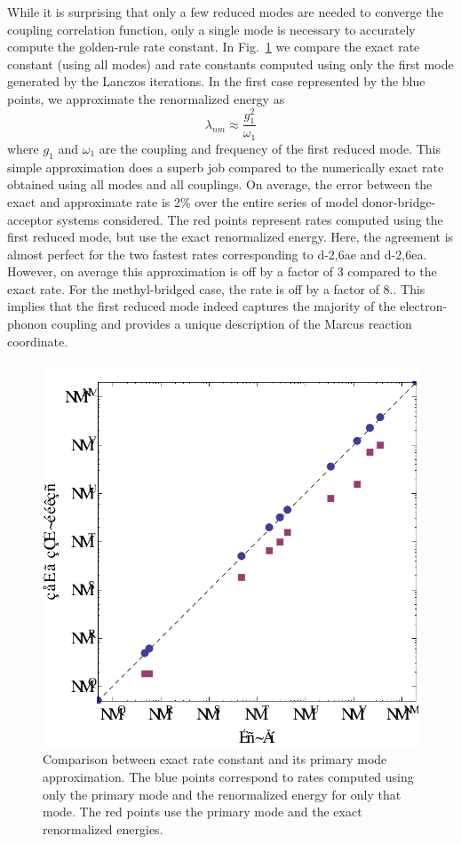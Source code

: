 While it is surprising that only a few reduced modes are needed to converge the coupling correlation function, only
a single mode is necessary to accurately compute the golden-rule rate constant.
In Fig.~\ref{fig-1mode} we compare the exact rate constant (using all modes) and rate constants computed using
only the first mode generated by the Lanczos iterations.   In the first case represented by the blue points,
we approximate the renormalized energy as
$$
\lambda_{nm} \approx \frac{g_{1}^{2}}{\omega_1}
$$
where $g_{1}$ and $\omega_{1}$ are the coupling and frequency of the first  reduced mode.  This simple approximation
does a superb job compared to the numerically exact rate obtained using all modes and all couplings.
On average, the error between the exact and approximate rate is 2\%
over the entire series of model donor-bridge-acceptor systems considered.
The red points represent rates computed using the first reduced mode, but use the exact renormalized energy.
Here, the agreement is almost perfect for the two fastest rates corresponding to d-2,6ae and d-2,6ea.   However,  on average
this approximation is off by a factor of 3 compared to the exact rate.  For the methyl-bridged case, the rate is off by a factor of 8..
This implies that the first reduced mode indeed captures the majority of the electron-phonon coupling
 and provides a unique description of the Marcus reaction coordinate.

\begin{figure}[t]
\includegraphics[width=0.6\columnwidth]{Chapters/chap2/Figure6}
\caption{Comparison between exact rate constant and its primary mode approximation.  The blue points correspond to rates computed using
only the primary mode and the renormalized energy for only that mode.  The red points use the primary mode and the exact
renormalized energies. }\label{fig-1mode}
\end{figure}

